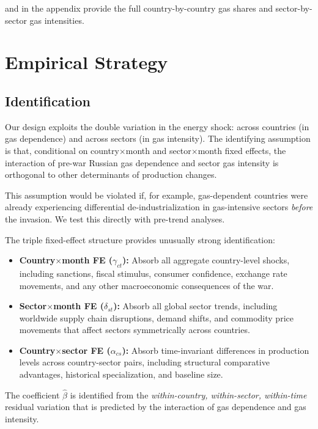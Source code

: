 \documentclass[12pt]{article}
\begin{document}
 and  in the appendix provide the full country-by-country gas shares and sector-by-sector gas intensities.

\section{Empirical Strategy}

\subsection{Identification}

Our design exploits the double variation in the energy shock: across countries (in gas dependence) and across sectors (in gas intensity). The identifying assumption is that, conditional on country$\times$month and sector$\times$month fixed effects, the interaction of pre-war Russian gas dependence and sector gas intensity is orthogonal to other determinants of production changes.

This assumption would be violated if, for example, gas-dependent countries were already experiencing differential de-industrialization in gas-intensive sectors \textit{before} the invasion. We test this directly with pre-trend analyses.

The triple fixed-effect structure provides unusually strong identification:
\begin{itemize}
\item \textbf{Country$\times$month FE ($\gamma_{ct}$):} Absorb all aggregate country-level shocks, including sanctions, fiscal stimulus, consumer confidence, exchange rate movements, and any other macroeconomic consequences of the war.
\item \textbf{Sector$\times$month FE ($\delta_{st}$):} Absorb all global sector trends, including worldwide supply chain disruptions, demand shifts, and commodity price movements that affect sectors symmetrically across countries.
\item \textbf{Country$\times$sector FE ($\alpha_{cs}$):} Absorb time-invariant differences in production levels across country-sector pairs, including structural comparative advantages, historical specialization, and baseline size.
\end{itemize}

The coefficient $\hat{\beta}$ is identified from the \textit{within-country, within-sector, within-time} residual variation that is predicted by the interaction of gas dependence and gas intensity.
\end{document}
